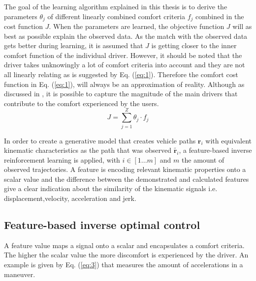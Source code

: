 The goal of the learning algorithm explained in this thesis is to derive the parameters $\theta_j$ of different linearly combined comfort criteria $f_j$ combined in the cost function $J$. When the parameters are learned, the objective function $J$ will as best as possible explain the observed data. As the match with the observed data gets better during learning, it is assumed that $J$ is getting closer to the inner comfort function of the individual driver. However, it should be noted that the driver takes unknowingly a lot of comfort criteria into account and they are not all linearly relating as is suggested by Eq. (\ref{eq:1}). Therefore the comfort cost function in Eq. (\ref{eq:1}), will always be an approximation of reality. Although as discussed in \cite{Kuderer2015a}, it is possible to capture the magnitude of the main drivers that contribute to the comfort experienced by the users.\\

\begin{equation}\label{eq:1}
	J = \sum_{j=1}^{Z}\theta_j\cdot f_j	
\end{equation}


In order to create a generative model that creates vehicle paths $\bm{r}_i$ with equivalent kinematic characteristics as the path that was observed $\tilde{\bm{r}_i}$, a feature-based inverse reinforcement learning is applied, with $i \in [1 ... m]$ and $m$ the amount of observed trajectories.\cite{Kuderer2015a,Abbeel2004} A feature is encoding relevant kinematic properties onto a scalar value and the difference between the demonstrated and calculated features give a clear indication about the similarity of the kinematic signals i.e. displacement,velocity, acceleration and jerk. \\

\subsection{Feature-based inverse optimal control}
A feature value maps a signal onto a scalar and encapsulates a comfort criteria. The higher the scalar value the more discomfort is experienced by the driver. An example is given by Eq. (\ref{eq:3}) that measures the amount of accelerations in a maneuver.

